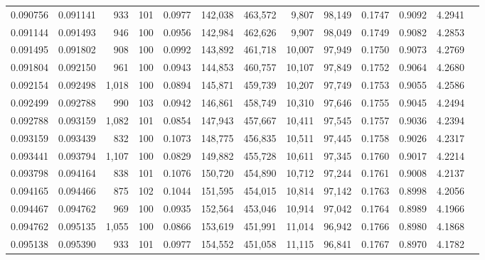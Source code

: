 \begin{tabular}{rrrrrrrrrrrrr}
0.090756 & 0.091141 &   933 & 101 &                                     0.0977 & 142,038 & 463,572 &   9,807 &  98,149 & 0.1747 & 0.9092 & 4.2941 \\
0.091144 & 0.091493 &   946 & 100 &                                     0.0956 & 142,984 & 462,626 &   9,907 &  98,049 & 0.1749 & 0.9082 & 4.2853 \\
0.091495 & 0.091802 &   908 & 100 &                                     0.0992 & 143,892 & 461,718 &  10,007 &  97,949 & 0.1750 & 0.9073 & 4.2769 \\
0.091804 & 0.092150 &   961 & 100 &                                     0.0943 & 144,853 & 460,757 &  10,107 &  97,849 & 0.1752 & 0.9064 & 4.2680 \\
0.092154 & 0.092498 & 1,018 & 100 &                                     0.0894 & 145,871 & 459,739 &  10,207 &  97,749 & 0.1753 & 0.9055 & 4.2586 \\
0.092499 & 0.092788 &   990 & 103 &                                     0.0942 & 146,861 & 458,749 &  10,310 &  97,646 & 0.1755 & 0.9045 & 4.2494 \\
0.092788 & 0.093159 & 1,082 & 101 &                                     0.0854 & 147,943 & 457,667 &  10,411 &  97,545 & 0.1757 & 0.9036 & 4.2394 \\
0.093159 & 0.093439 &   832 & 100 &                                     0.1073 & 148,775 & 456,835 &  10,511 &  97,445 & 0.1758 & 0.9026 & 4.2317 \\
0.093441 & 0.093794 & 1,107 & 100 &                                     0.0829 & 149,882 & 455,728 &  10,611 &  97,345 & 0.1760 & 0.9017 & 4.2214 \\
0.093798 & 0.094164 &   838 & 101 &                                     0.1076 & 150,720 & 454,890 &  10,712 &  97,244 & 0.1761 & 0.9008 & 4.2137 \\
0.094165 & 0.094466 &   875 & 102 &                                     0.1044 & 151,595 & 454,015 &  10,814 &  97,142 & 0.1763 & 0.8998 & 4.2056 \\
0.094467 & 0.094762 &   969 & 100 &                                     0.0935 & 152,564 & 453,046 &  10,914 &  97,042 & 0.1764 & 0.8989 & 4.1966 \\
0.094762 & 0.095135 & 1,055 & 100 &                                     0.0866 & 153,619 & 451,991 &  11,014 &  96,942 & 0.1766 & 0.8980 & 4.1868 \\
0.095138 & 0.095390 &   933 & 101 &                                     0.0977 & 154,552 & 451,058 &  11,115 &  96,841 & 0.1767 & 0.8970 & 4.1782 \\

\end{tabular}

